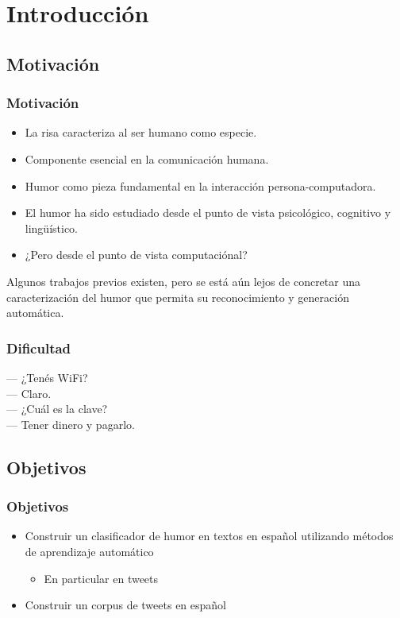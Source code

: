 \section{Introducción} 

\subsection{Motivación}

\begin{frame}[allowframebreaks]
    \frametitle{Motivación}
    \begin{itemize}
        \item La risa caracteriza al ser humano como especie.
        \item Componente esencial en la comunicación humana.
        \item Humor como pieza fundamental en la interacción persona-computadora.
    \end{itemize}

    \framebreak
    
    \begin{itemize}
        \item El humor ha sido estudiado desde el punto de vista psicológico, cognitivo y lingüístico.
        \item ¿Pero desde el punto de vista computaciónal?
    \end{itemize}
    Algunos trabajos previos existen, pero se está aún lejos de concretar una caracterización del humor que permita su reconocimiento y generación automática.
\end{frame}

\begin{frame}
    \frametitle{Dificultad}
    
    --- ¿Tenés WiFi? \\
    --- Claro. \\
    --- ¿Cuál es la clave? \\
    --- Tener dinero y pagarlo. \\
\end{frame}

\subsection{Objetivos}

\begin{frame}
    \frametitle{Objetivos}
    \begin{itemize}
        \item Construir un clasificador de humor en textos en español utilizando métodos de aprendizaje automático
            \begin{itemize}
                \item En particular en tweets
            \end{itemize}
        \item Construir un corpus de tweets en español
    \end{itemize}
\end{frame}
